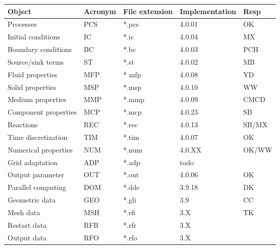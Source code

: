 \begin{center}
\begin{tabular*}{12.715cm}{|p{3.5cm}|p{1.5cm}|p{2.0cm}|p{2.2cm}|p{1.4cm}|}
\hline
Object               & Acronym & File extension & Implementation & Resp
\\ \hline \hline
Processes            & PCS & *.pcs & 4.0.01 & OK\\
Initial conditions   & IC  & *.ic  & 4.0.04 & MX\\
Boundary conditions  & BC  & *.bc  & 4.0.03 & PCH\\
Source/sink terms    & ST  & *.st  & 4.0.02 & MB\\
Fluid properties     & MFP & * mfp & 4.0.08 & YD \\
Solid properties     & MSP & *.msp & 4.0.10 & WW \\
Medium properties    & MMP & *.mmp & 4.0.09 & CMCD\\
Component properties & MCP & *.mcp & 4.0.23 & SB\\
Reactions            & REC & *.rec & 4.0.13 & SB/MX\\
Time discretization  & TIM & *.tim & 4.0.07 & OK \\
Numerical properties & NUM & *.num & 4.0.XX & OK/WW\\
Grid adaptation      & ADP & *.adp & todo & \\
Output parameter     & OUT & *.out & 4.0.06 & OK \\
Parallel computing   & DOM & *.ddc & 3.9.18 & DK \\
\hline
Geometric data       & GEO & *.gli & 3.9 & CC \\
Mesh data            & MSH & *.rfi & 3.X & TK \\
Restart data         & RFR & *.rfr & 3.X & \\
Output data          & RFO & *.rfo & 3.X & \\
\hline
\end{tabular*}
\end{center}

